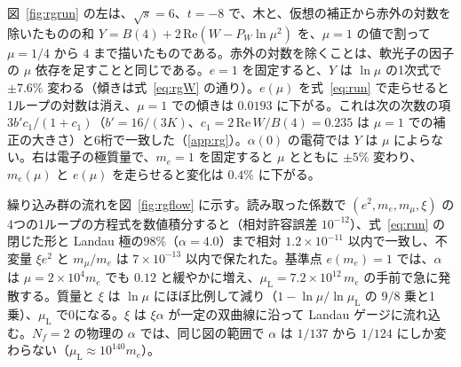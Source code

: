 \documentclass[a4paper,10pt]{ltjsarticle}
\begin{document}
図~\ref{fig:rgrun} の左は、$\sqrt s=6$、$t=-8$ で、木と、仮想の補正から赤外の対数を除いたものの和 $Y=B(4)+2\,\mathrm{Re}(W-P_W\ln\mu^2)$ を、$\mu=1$ の値で割って $\mu=1/4$ から $4$ まで描いたものである。赤外の対数を除くことは、軟光子の因子の $\mu$ 依存を足すことと同じである。$e=1$ を固定すると、$Y$ は $\ln\mu$ の1次式で $\pm7.6\%$ 変わる（傾きは式~\eqref{eq:rgW} の通り）。$e(\mu)$ を式~\eqref{eq:run} で走らせると1ループの対数は消え、$\mu=1$ での傾きは $0.0193$ に下がる。これは次の次数の項 $3b'c_1/(1+c_1)$（$b'=16/(3K)$、$c_1=2\,\mathrm{Re}\,W/B(4)=0.235$ は $\mu=1$ での補正の大きさ）と6桁で一致した（\ref{app:rg}）。$\alpha(0)$ の電荷では $Y$ は $\mu$ によらない。右は電子の極質量で、$m_e=1$ を固定すると $\mu$ とともに $\pm5\%$ 変わり、$m_e(\mu)$ と $e(\mu)$ を走らせると変化は $0.4\%$ に下がる。

繰り込み群の流れを図~\ref{fig:rgflow} に示す。読み取った係数で $(e^2,m_e,m_\mu,\xi)$ の4つの1ループの方程式を数値積分すると（相対許容誤差 $10^{-12}$）、式~\eqref{eq:run} の閉じた形と Landau 極の98\%（$\alpha=4.0$）まで相対 $1.2\times10^{-11}$ 以内で一致し、不変量 $\xi e^2$ と $m_\mu/m_e$ は $7\times10^{-13}$ 以内で保たれた。基準点 $e(m_e)=1$ では、$\alpha$ は $\mu=2\times10^{4}m_e$ でも $0.12$ と緩やかに増え、$\mu_{\mathrm L}=7.2\times10^{12}\,m_e$ の手前で急に発散する。質量と $\xi$ は $\ln\mu$ にほぼ比例して減り（$1-\ln\mu/\ln\mu_{\mathrm L}$ の $9/8$ 乗と1乗）、$\mu_{\mathrm L}$ で0になる。$\xi$ は $\xi\alpha$ が一定の双曲線に沿って Landau ゲージに流れ込む。$N_f=2$ の物理の $\alpha$ では、同じ図の範囲で $\alpha$ は $1/137$ から $1/124$ にしか変わらない（$\mu_{\mathrm L}\approx10^{140}m_e$）。
\end{document}
